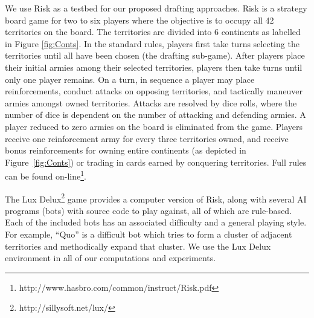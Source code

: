 \documentclass[letterpaper]{article}
\numberwithin{equation}{section}
\numberwithin{theorem}{section}
\numberwithin{lemma}{section}
\numberwithin{df}{section}
\begin{document}
We use Risk as a testbed for our proposed drafting approaches.  Risk is a strategy board game for two to six players where the objective is to occupy all 42 territories on the board.  The territories are divided into 6 continents
as labelled in Figure \ref{fig:Conts}.  In the standard rules, players first take turns selecting the territories until all have been chosen (the drafting sub-game).  After players place their initial armies among their selected territories, players then take turns until only one player remains.  On a turn, in sequence a player may place reinforcements, conduct attacks on opposing territories, and tactically maneuver armies amongst owned territories.  Attacks are resolved by dice rolls, where the number of dice is dependent on the number of attacking and defending armies.  A player reduced to zero armies on the board is eliminated from the game.  Players receive one reinforcement army for every three territories owned, and receive bonus reinforcements for owning entire continents (as depicted in Figure~\ref{fig:Conts}) or trading in cards earned by conquering territories. Full rules can be found on-line\footnote{http://www.hasbro.com/common/instruct/Risk.pdf}.

The Lux Delux\footnote{http://sillysoft.net/lux/} game provides a computer version of Risk, along with several AI programs (bots) with source code to play against, all of which are rule-based.  Each of the included bots has an associated difficulty and a general playing style.  For example, ``Quo'' is a difficult bot which tries to form a cluster of adjacent territories and methodically expand that cluster.  We use the Lux Delux environment in all of our computations and experiments.
\end{document}
